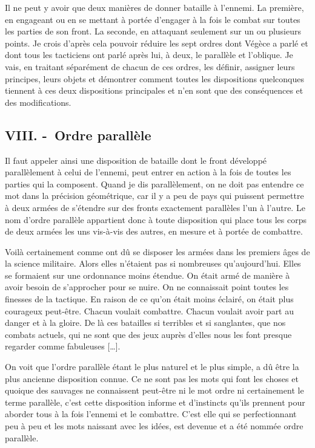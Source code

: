 \documentclass[french,twoside]{book} %
\begin{document}
Il ne peut y avoir que deux manières de donner bataille à l’ennemi. La première, en engageant ou en se mettant à portée d’engager à la fois le combat sur toutes les parties de son front. La seconde, en attaquant seulement sur un ou plusieurs points. Je crois d’après cela pouvoir réduire les sept ordres dont Végèce a parlé et dont tous les tacticiens ont parlé après lui, à deux, le parallèle et l’oblique. Je vais, en traitant séparément de chacun de ces ordres, les définir, assigner leurs principes, leurs objets et démontrer comment toutes les dispositions quelconques tiennent à ces deux dispositions principales et n’en sont que des conséquences et des modifications.
\subsection[{VIII. - Ordre parallèle}]{VIII. - Ordre parallèle}
\noindent Il faut appeler ainsi une disposition de bataille dont le front développé parallèlement à celui de l’ennemi, peut entrer en action à la fois de toutes les parties qui la composent. Quand je dis parallèlement, on ne doit pas entendre ce mot dans la précision géométrique, car il y a peu de pays qui puissent permettre à deux armées de s’étendre sur des fronts exactement parallèles l’un à l’autre. Le nom d’ordre parallèle appartient donc à toute disposition qui place tous les corps de deux armées les uns vis-à-vis des autres, en mesure et à portée de combattre.\par
Voilà certainement comme ont dû se disposer les armées dans les premiers âges de la science militaire. Alors elles n’étaient pas si nombreuses qu’aujourd’hui. Elles se formaient sur une ordonnance moins étendue. On était armé de manière à avoir besoin de s’approcher pour se nuire. On ne connaissait point toutes les finesses de la tactique. En raison de ce qu’on était moins éclairé, on était plus courageux peut-être. Chacun voulait combattre. Chacun voulait avoir part au danger et à la gloire. De là ces batailles si terribles et si sanglantes, que nos combats actuels, qui ne sont que des jeux auprès d’elles nous les font presque regarder comme fabuleuses […].\par
On voit que l’ordre parallèle étant le plus naturel et le plus simple, a dû être la plus ancienne disposition connue. Ce ne sont pas les mots qui font les choses et quoique des sauvages ne connaissent peut-être ni le mot ordre ni certainement le terme parallèle, c’est cette disposition informe et d’instincts qu’ils prennent pour aborder tous à la fois l’ennemi et le combattre. C’est elle qui se perfectionnant peu à peu et les mots naissant avec les idées, est devenue et a été nommée ordre parallèle.\par
\end{document}
